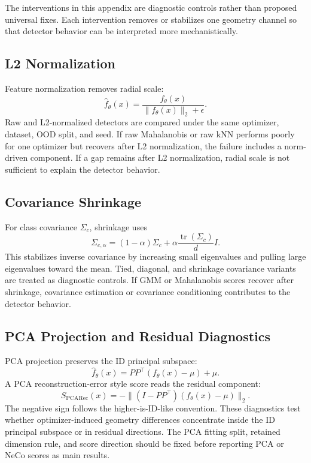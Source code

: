The interventions in this appendix are diagnostic controls rather than proposed
universal fixes. Each intervention removes or stabilizes one geometry channel so
that detector behavior can be interpreted more mechanistically.

\subsection{L2 Normalization}
\label{app:l2-normalization}

Feature normalization removes radial scale:
\[
    \hat{f}_\theta(x)
    =
    \frac{f_\theta(x)}
    {\|f_\theta(x)\|_2+\epsilon}.
\]
Raw and L2-normalized detectors are compared under the same optimizer, dataset,
OOD split, and seed. If raw Mahalanobis or raw kNN performs poorly for one
optimizer but recovers after L2 normalization, the failure includes a
norm-driven component. If a gap remains after L2 normalization, radial scale is
not sufficient to explain the detector behavior.

\subsection{Covariance Shrinkage}
\label{app:covariance-shrinkage}

For class covariance \(\Sigma_c\), shrinkage uses
\[
    \Sigma_{c,\alpha}
    =
    (1-\alpha)\Sigma_c
    +
    \alpha\frac{\operatorname{tr}(\Sigma_c)}{d}I.
\]
This stabilizes inverse covariance by increasing small eigenvalues and pulling
large eigenvalues toward the mean. Tied, diagonal, and shrinkage covariance
variants are treated as diagnostic controls. If GMM or Mahalanobis scores
recover after shrinkage, covariance estimation or covariance conditioning
contributes to the detector behavior.

\subsection{PCA Projection and Residual Diagnostics}
\label{app:pca-projection-residual}

PCA projection preserves the ID principal subspace:
\[
    \hat{f}_\theta(x)
    =
    PP^\top(f_\theta(x)-\mu)+\mu.
\]
A PCA reconstruction-error style score reads the residual component:
\[
    S_{\mathrm{PCARec}}(x)
    =
    -\|(I-PP^\top)(f_\theta(x)-\mu)\|_2.
\]
The negative sign follows the higher-is-ID-like convention. These diagnostics
test whether optimizer-induced geometry differences concentrate inside the ID
principal subspace or in residual directions. The PCA fitting split, retained
dimension rule, and score direction should be fixed before reporting PCA or
NeCo scores as main results.

